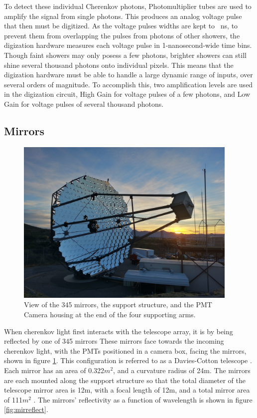 To detect these individual Cherenkov photons, Photomultiplier tubes are used to amplify the signal from single photons.
This produces an analog voltage pulse that then must be digitized.
As the voltage pulses widths are kept to ~ns, to prevent them from overlapping the pulses from photons of other showers, the digization hardware measures each voltage pulse in 1-nanosecond-wide time bins.
Though faint showers may only posess a few photons, brighter showers can still shine several thousand photons onto individual pixels.
This means that the digization hardware must be able to handle a large dynamic range of inputs, over several orders of magnitude.
To accomplish this, two amplification levels are used in the digization circuit, High Gain for voltage pulses of a few photons, and Low Gain for voltage pulses of several thousand photons.


\subsection{Mirrors}

\begin{figure}[h]
  \begin{center}
    \includegraphics[width=0.95\textwidth]{images/single_telescope}
    \caption[Single Telescope]{View of the 345 mirrors, the support structure, and the PMT Camera housing at the end of the four supporting arms.}\label{fig:davcottel}
  \end{center}
\end{figure}

When cherenkov light first interacts with the telescope array, it is by being reflected by one of 345 mirrors
These mirrors face towards the incoming cherenkov light, with the PMTs positioned in a camera box, facing the mirrors, shown in figure \ref{fig:davcottel}.
This configuration is referred to as a Davies-Cotton telescope \cite{daviescotton}.
Each mirror has an area of 0.322$m^2$, and a curvature radius of 24m.
The mirrors are each mounted along the support structure so that the total diameter of the telescope mirror area is 12m, with a focal length of 12m, and a total mirror area of 111$m^2$ \cite{Veritas_Detector}.
The mirrors' reflectivity as a function of wavelength is shown in figure \ref{fig:mirreflect}.

